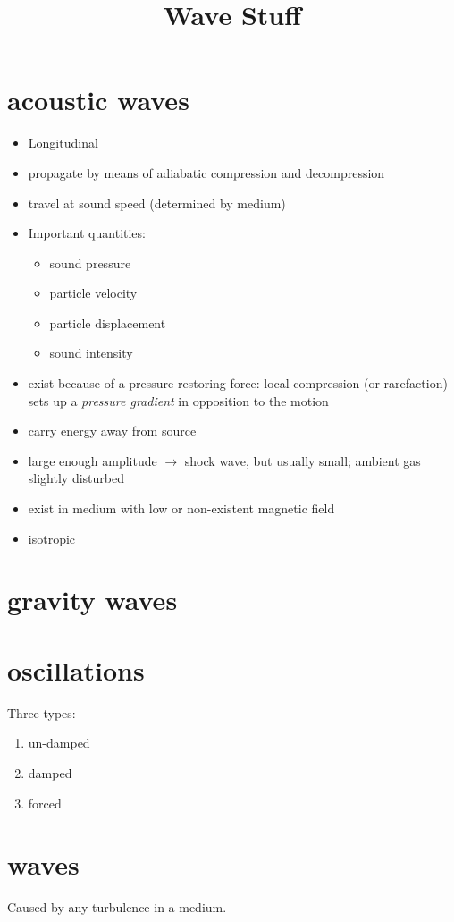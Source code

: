 \documentclass[12pt]{article}
\title{\vspace{-0.5in}Wave Stuff}
\author{}
\date{}
\begin{document}
\maketitle

\vspace{-1in}

\section*{acoustic waves}
\begin{itemize}
    \item Longitudinal
    \item propagate by means of adiabatic compression and decompression
    \item travel at sound speed (determined by medium)
    \item Important quantities:
        \begin{itemize}
            \item sound pressure
            \item particle velocity
            \item particle displacement
            \item sound intensity
        \end{itemize}
    \item exist because of a pressure restoring force: local compression
        (or rarefaction) sets up a \emph{pressure gradient} in opposition
        to the motion
    \item carry energy away from source
    \item large enough amplitude $\rightarrow$ shock wave,
        but usually small; ambient gas slightly disturbed
    \item exist in medium with low or non-existent magnetic field
    \item isotropic

\end{itemize}

\section*{gravity waves}

\section*{oscillations}
Three types:
\begin{enumerate}
    \item un-damped
    \item damped
    \item forced
\end{enumerate}

\section*{waves}
Caused by any turbulence in a medium.
\end{document}
